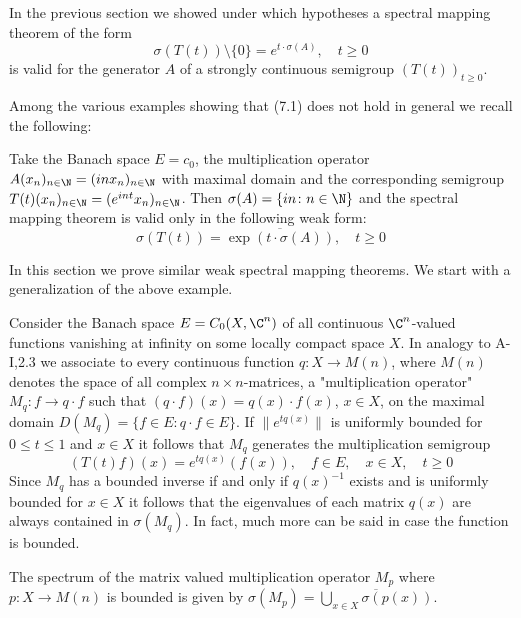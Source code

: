 In the previous section we showed under which hypotheses a spectral mapping theorem of the form
\begin{equation}\label{eq:a3-7.1}
\sigma(T(t)) \setminus \{0\} = e^{t \cdot \sigma(A)}, \quad t \geq 0
\end{equation}
is valid for the generator $A$ of a strongly continuous semigroup $(T(t))_{t\geq 0}$.

Among the various examples showing that (7.1) does not hold in general we recall the following:

Take the Banach space $E = c_{0}$, the multiplication operator $A(x_{n})_{n\in\N} = (inx_{n})_{n\in\N}$ with maximal domain and the corresponding semigroup $T(t)(x_{n})_{n\in\N} = (e^{int}x_{n})_{n\in\N}$.
Then $\sigma(A) = \{in \colon n \in \N\}$ and the spectral mapping theorem is valid only in the following weak form:
\begin{equation}\label{eq:a3-7.2}
\sigma(T(t)) = \overline{\exp(t\cdot\sigma(A))}, \quad t \geq 0
\end{equation}

In this section we prove similar weak spectral mapping theorems.
We start with a generalization of the above example.

Consider the Banach space $E = C_{0}(X,\C^{n})$ of all continuous $\C^{n}$-valued functions vanishing at infinity on some locally compact space $X$.
In analogy to A-I,2.3 we associate to every continuous function $q \colon X \to M(n)$, where $M(n)$ denotes the space of all complex $n\times n$-matrices, a "multiplication operator" $M_{q} \colon f \to q\cdot f$ such that $(q\cdot f)(x) = q(x)\cdot f(x)$, $x \in X$, on the maximal domain $D(M_{q}) = \{f \in E \colon q\cdot f \in E\}$.
If $\|e^{tq(x)}\|$ is uniformly bounded for $0 \leq t \leq 1$ and $x \in X$ it follows that $M_{q}$ generates the multiplication semigroup
\[
(T(t)f)(x) = e^{tq(x)}(f(x)), \quad f \in E, \quad x \in X, \quad t \geq 0
\]
Since $M_{q}$ has a bounded inverse if and only if $q(x)^{-1}$ exists and is uniformly bounded for $x \in X$ it follows that the eigenvalues of each matrix $q(x)$ are always contained in $\sigma(M_{q})$.
In fact, much more can be said in case the function is bounded.



\begin{lemma}\label{lem:a3-6.1}
The spectrum of the matrix valued multiplication operator $M_{p}$ where $p \colon X \to M(n)$ is bounded is given by $\sigma(M_{p}) = \overline{\bigcup_{x\in X} \sigma(p(x))}$.
\end{lemma}

